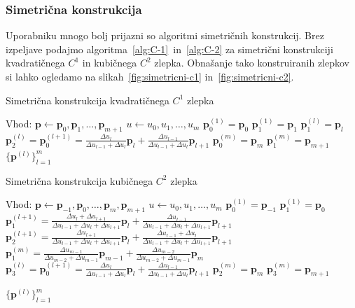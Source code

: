 \documentclass[isrm2, tisk]{fmfdelo}
\newcommand{\p}{\mathbf{p}}
\begin{document}
    \subsubsection{Simetrična konstrukcija}
    Uporabniku mnogo bolj prijazni so algoritmi simetričnih konstrukcij.
    Brez izpeljave podajmo algoritma~\ref{alg:C-1}~in~\ref{alg:C-2} za simetrični konstrukciji kvadratičnega $C^1$ in kubičnega $C^2$ zlepka.
    Obnašanje tako konstruiranih zlepkov si lahko ogledamo na slikah~\ref{fig:simetricni-c1} in~\ref{fig:simetricni-c2}.
    \begin{algorithm}[H]
        \caption{Simetrična konstrukcija kvadratičnega $C^1$ zlepka}
        \label{alg:C-1}
        \begin{algorithmic}
            \State Vhod:
            \State $\p \gets \p_0,\p_1,\dots,\p_{m+1}$
            \State $u \gets u_0,u_1,\dots,u_m$
            \State
            \State $\p_0^{(1)} = \p_0$
            \State $\p_1^{(1)} = \p_1$
                \State $\p_1^{(l)}=\p_{l}$
                \State $\p_2^{(l)} = \p_0^{(l+1)} = \frac{\Delta u_l}{\Delta u_{l-1} + \Delta u_{l}}\p_l+\frac{\Delta u_{l-1}}{\Delta u_{l-1} + \Delta u_{l}}\p_{l+1}$
            \EndFor
            \State $\p_0^{(m)} = \p_m$
            \State $\p_1^{(m)} = \p_{m+1}$
            \State
            \State \Return $\{\mathbf{p}^{(l)}\}^{m}_{l=1}$
        \end{algorithmic}
    \end{algorithm}
    \begin{algorithm}[H]
        \caption{Simetrična konstrukcija kubičnega $C^2$ zlepka}
        \label{alg:C-2}
        \begin{algorithmic}
            \State Vhod:
            \State $\p \gets \p_{-1},\p_0,\dots,\p_{m},\p_{m+1}$
            \State $u \gets u_0,u_1,\dots,u_m$
            \State
            \State $\p_0^{(1)} = \p_{-1}$
            \State $\p_1^{(1)} = \p_0$
                \State $\p_1^{(l+1)} = \frac{\Delta u_l + \Delta u_{l+1}}{\Delta u_{l-1} + \Delta u_{l}+ \Delta u_{l+1}}\p_l+\frac{\Delta u_{l-1}}{\Delta u_{l-1} + \Delta u_{l}+ \Delta u_{l+1}}\p_{l+1}$
                \State $\p_2^{(l+1)} = \frac{ \Delta u_{l+1}}{\Delta u_{l-1} + \Delta u_{l}+ \Delta u_{l+1}}\p_l+\frac{\Delta u_{l-1}+\Delta u_l }{\Delta u_{l-1} + \Delta u_{l}+ \Delta u_{l+1}}\p_{l+1}$
            \EndFor
            \State $\p_1^{(m)}= \frac{\Delta u_{m-1}}{\Delta u_{m-2} + \Delta u_{m-1}}\p_{m-1}+\frac{\Delta u_{m-2}}{\Delta u_{m-2} + \Delta u_{m-1}}\p_{m}$
                \State $\p_3^{(l)} = \p_0^{(l+1)} = \frac{\Delta u_l}{\Delta u_{l-1} + \Delta u_{l}}\p_l+\frac{\Delta u_{l-1}}{\Delta u_{l-1} + \Delta u_{l}}\p_{l+1}$
            \EndFor
            \State $\p_2^{(m)} = \p_m$
            \State $\p_3^{(m)} = \p_{m+1}$

            \State
            \State \Return $\{\mathbf{p}^{(l)}\}^{m}_{l=1}$
        \end{algorithmic}
    \end{algorithm}
\end{document}
